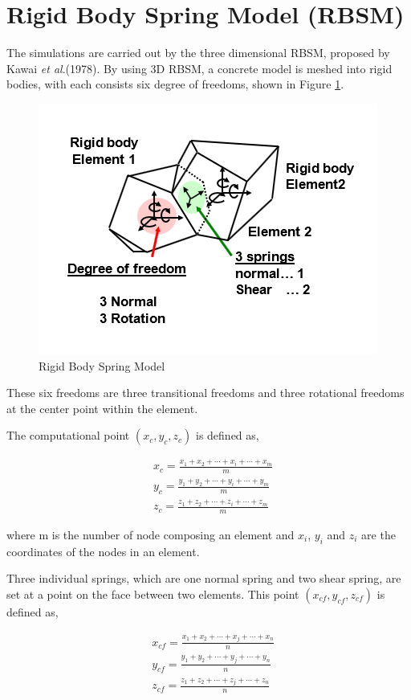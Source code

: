 \section{Rigid Body Spring Model (RBSM)}

The simulations are carried out by the three dimensional RBSM, proposed by Kawai \textit{et al}.(1978). By using 3D RBSM, a concrete model is meshed into rigid bodies, with each consists six degree of freedoms, shown in Figure \ref{fig:RBSM}.

\begin{figure}[ht!]
\centering
\includegraphics[width=.4\linewidth]{Files/Background/RBSM_1.png}
  \caption{Rigid Body Spring Model}
  \label{fig:RBSM}
\end{figure}

These six freedoms are three transitional freedoms and three rotational freedoms at the center point within the element.

The computational point $(x_c, y_c, z_c)$ is defined as,

\begin{equation}
  \begin{aligned}
  &x_c=\frac{x_1 + x_2 + \cdots + x_i + \cdots + x_m}{m} \\
  &y_c=\frac{y_1 + y_2 + \cdots + y_i + \cdots + y_m}{m} \\
  &z_c=\frac{z_1 + z_2 + \cdots + z_i + \cdots + z_m}{m}
  \end{aligned}
\end{equation}

where m is the number of node composing an element and $x_i$, $y_i$ and $z_i$ are the coordinates of the nodes in an element.

Three individual springs, which are one normal spring and two shear spring, are set at a point on the face between two elements. This point $(x_{cf}, y_{cf}, z_{cf})$ is defined as,

\begin{equation}
  \begin{aligned}
  &x_{cf}=\frac{x_1 + x_2 + \cdots + x_j + \cdots + x_n}{n} \\
  &y_{cf}=\frac{y_1 + y_2 + \cdots + y_j + \cdots + y_n}{n} \\
  &z_{cf}=\frac{z_1 + z_2 + \cdots + z_j + \cdots + z_n}{n}
  \end{aligned}
\end{equation}

